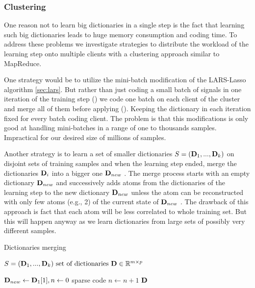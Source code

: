 \subsubsection{Clustering}
One reason not to learn big dictionaries in a single step is the fact that
learning such big dictionaries leads to huge memory consumption and coding time.
To address these problems we investigate strategies to distribute the workload
of the learning step onto multiple clients with a clustering approach similar to
MapReduce. 

One strategy would be to utilize the mini-batch
modification of the LARS-Lasso algorithm \ref{sec:lars}. But rather
than just coding a small batch of signals in one iteration of the training
step () we code one batch on each client of the cluster
and merge all of them before applying (). Keeping the
dictionary in each iteration fixed for every batch coding client. The problem is
that this modifications is only good at handling mini-batches in a range of one
to thousands samples. Impractical for our desired size of millions of samples.

Another strategy is to learn a set of smaller dictionaries $S =
(\boldsymbol{\mathrm{D}}_1, ..., \boldsymbol{\mathrm{D}}_k)$ on disjoint sets of training samples and when
the learning step ended, merge the dictionaries $\boldsymbol{\mathrm{D}}_i$ into a bigger one
$\boldsymbol{\mathrm{D}}_{new}$ . The merge process starts with an empty dictionary
$\boldsymbol{\mathrm{D}}_{new}$  and successively adds atoms from the dictionaries of the
learning step to the new dictionary $\boldsymbol{\mathrm{D}}_{new}$  unless the atom can be
reconstructed with only few atoms (e.g., 2) of the current state of
$\boldsymbol{\mathrm{D}}_{new}$ . The drawback of this approach is fact that 
each atom will be less correlated to whole training set. But this will happen
anyway as we learn dictionaries from large sets of possibly very different
samples. 

\begin{algorithm}[H]
\caption{Dictionaries merging}
\label{alg:merging}
\begin{algorithmic}[1]
\REQUIRE $ S = (\boldsymbol{\mathrm{D}}_1, ..., \boldsymbol{\mathrm{D}}_k) \text{ set of dictionaries } \boldsymbol{\mathrm{D}}
\in \mathbb{R}^{m\times p}$

\STATE $\boldsymbol{\mathrm{D}}_{new} \gets \boldsymbol{\mathrm{D}}_{1}[1], n \gets 0$
\STATE sparse code 
\STATE $n \gets n+1$
\ENDFOR
\ENDFOR
\RETURN $\boldsymbol{\mathrm{D}}$
\end{algorithmic}
\end{algorithm}

